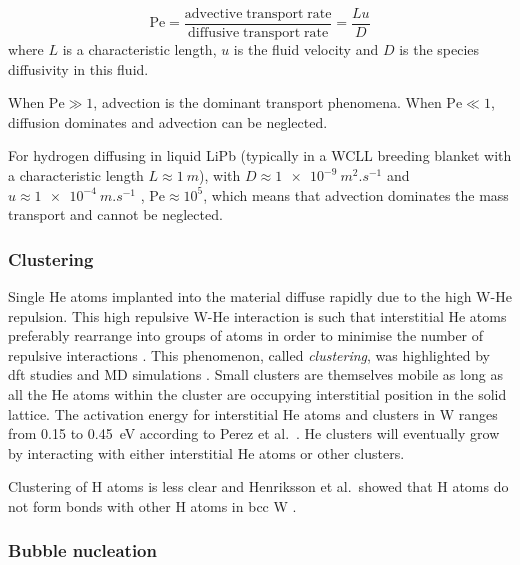 \begin{equation}
    \mathrm{Pe} = \frac{\mathrm{advective \; transport \; rate}}{\mathrm{diffusive \; transport \; rate}} = \frac{L u}{D}
\end{equation}
where $L$ is a characteristic length, $u$ is the fluid velocity and $D$ is the species diffusivity in this fluid.

When $\mathrm{Pe} \gg 1$, \gls{advection} is the dominant transport phenomena.
When $\mathrm{Pe} \ll 1$, \gls{diffusion} dominates and \gls{advection} can be neglected.

For hydrogen diffusing in liquid LiPb (typically in a WCLL breeding blanket with a characteristic length $L \approx \SI{1}{m}$), with $D \approx \SI{1e-9}{m^2.s^{-1}}$ and $u \approx \SI{1e-4}{m.s^{-1}}$ , $\mathrm{Pe} \approx 10^{5}$, which means that \gls{advection} dominates the mass transport and cannot be neglected.

\subsubsection{Clustering}
Single \gls{He} atoms implanted into the material diffuse rapidly due to the high W-He repulsion.
This high repulsive W-He interaction is such that interstitial \gls{He} atoms preferably rearrange into groups of atoms in order to minimise the number of repulsive interactions .
This phenomenon, called \emph{clustering}, was highlighted by \gls{dft} studies \cite{becquart_density_2009,dunn_rate_2013} and MD simulations \cite{henriksson_molecular_2006}.
Small clusters are themselves mobile as long as all the \gls{He} atoms within the cluster are occupying interstitial position in the solid \gls{lattice}.
The activation energy for interstitial \gls{He} atoms and clusters in \gls{W} ranges from 0.15 to \SI{0.45}{eV} according to Perez et al.\ .
He clusters will eventually grow by interacting with either interstitial \gls{He} atoms or other clusters.

Clustering of \gls{H} atoms is less clear and Henriksson et al.\ showed that \gls{H} atoms do not form bonds with other \gls{H} atoms in \gls{bcc} \gls{W} .

\subsubsection{Bubble nucleation}

